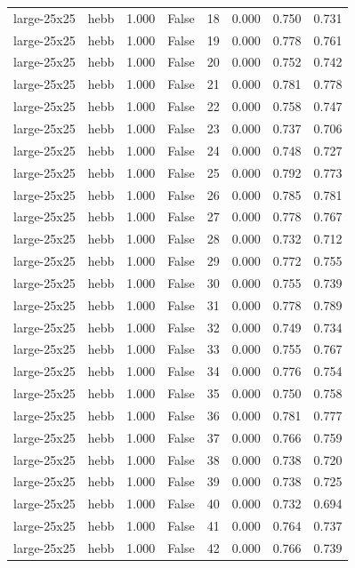 \begin{tabular}{llrrrrrr}
large-25x25 & hebb & 1.000 & False & 18 & 0.000 & 0.750 & 0.731 \\
large-25x25 & hebb & 1.000 & False & 19 & 0.000 & 0.778 & 0.761 \\
large-25x25 & hebb & 1.000 & False & 20 & 0.000 & 0.752 & 0.742 \\
large-25x25 & hebb & 1.000 & False & 21 & 0.000 & 0.781 & 0.778 \\
large-25x25 & hebb & 1.000 & False & 22 & 0.000 & 0.758 & 0.747 \\
large-25x25 & hebb & 1.000 & False & 23 & 0.000 & 0.737 & 0.706 \\
large-25x25 & hebb & 1.000 & False & 24 & 0.000 & 0.748 & 0.727 \\
large-25x25 & hebb & 1.000 & False & 25 & 0.000 & 0.792 & 0.773 \\
large-25x25 & hebb & 1.000 & False & 26 & 0.000 & 0.785 & 0.781 \\
large-25x25 & hebb & 1.000 & False & 27 & 0.000 & 0.778 & 0.767 \\
large-25x25 & hebb & 1.000 & False & 28 & 0.000 & 0.732 & 0.712 \\
large-25x25 & hebb & 1.000 & False & 29 & 0.000 & 0.772 & 0.755 \\
large-25x25 & hebb & 1.000 & False & 30 & 0.000 & 0.755 & 0.739 \\
large-25x25 & hebb & 1.000 & False & 31 & 0.000 & 0.778 & 0.789 \\
large-25x25 & hebb & 1.000 & False & 32 & 0.000 & 0.749 & 0.734 \\
large-25x25 & hebb & 1.000 & False & 33 & 0.000 & 0.755 & 0.767 \\
large-25x25 & hebb & 1.000 & False & 34 & 0.000 & 0.776 & 0.754 \\
large-25x25 & hebb & 1.000 & False & 35 & 0.000 & 0.750 & 0.758 \\
large-25x25 & hebb & 1.000 & False & 36 & 0.000 & 0.781 & 0.777 \\
large-25x25 & hebb & 1.000 & False & 37 & 0.000 & 0.766 & 0.759 \\
large-25x25 & hebb & 1.000 & False & 38 & 0.000 & 0.738 & 0.720 \\
large-25x25 & hebb & 1.000 & False & 39 & 0.000 & 0.738 & 0.725 \\
large-25x25 & hebb & 1.000 & False & 40 & 0.000 & 0.732 & 0.694 \\
large-25x25 & hebb & 1.000 & False & 41 & 0.000 & 0.764 & 0.737 \\
large-25x25 & hebb & 1.000 & False & 42 & 0.000 & 0.766 & 0.739 \\

\end{tabular}
